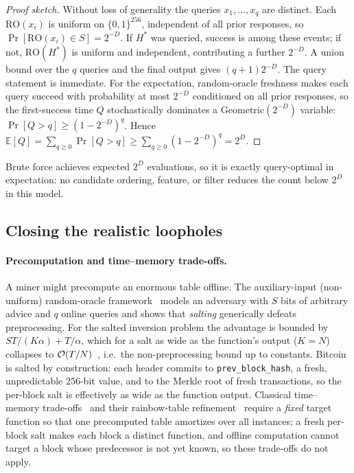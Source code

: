 \documentclass[11pt]{article}
\begin{document}
\begin{proof}[Proof sketch]
Without loss of generality the queries $x_1,\dots,x_q$ are distinct.
Each $\mathrm{RO}(x_i)$ is uniform on $\{0,1\}^{256}$, independent of all
prior responses, so $\Pr[\mathrm{RO}(x_i)\in S]=2^{-D}$. If $H^\ast$ was
queried, success is among these events; if not, $\mathrm{RO}(H^\ast)$ is
uniform and independent, contributing a further $2^{-D}$. A union bound
over the $q$ queries and the final output gives $(q+1)2^{-D}$. The query
statement is immediate. For the expectation, random-oracle freshness makes
each query succeed with probability at most $2^{-D}$ conditioned on all
prior responses, so the first-success time $Q$ stochastically dominates a
$\mathrm{Geometric}(2^{-D})$ variable: $\Pr[Q>q]\ge(1-2^{-D})^{q}$. Hence
$\mathbb{E}[Q]=\sum_{q\ge0}\Pr[Q>q]\ge\sum_{q\ge0}(1-2^{-D})^{q}=2^{D}$.
\end{proof}

Brute force achieves expected $2^{D}$ evaluations, so it is
exactly query-optimal in expectation: no candidate ordering, feature,
or filter reduces the count below $2^{D}$ in this model.

\subsection{Closing the realistic loopholes}

\paragraph{Precomputation and time--memory trade-offs.}
A miner might precompute an enormous table offline. The auxiliary-input
(non-uniform) random-oracle framework~\cite{unruh,cdgs,cdg} models an
adversary with $S$ bits of arbitrary advice and $q$ online queries and
shows that \emph{salting} generically defeats preprocessing. For the
salted inversion problem the advantage is bounded by
$ST/(K\alpha)+T/\alpha$, which for a salt as wide as the function's
output ($K=N$) collapses to $\mathcal{O}(T/N)$~\cite{dgk}, i.e.\ the
non-preprocessing bound up to constants. Bitcoin is salted by
construction: each header commits to \texttt{prev\_block\_hash}, a fresh,
unpredictable $256$-bit value, and to the Merkle root of fresh
transactions, so the per-block salt is effectively as wide as the
function output.
Classical time--memory trade-offs~\cite{hellman} and their rainbow-table
refinement~\cite{rainbow} require a \emph{fixed} target function so that
one precomputed table amortizes over all instances; a fresh per-block
salt makes each block a distinct function, and offline computation cannot
target a block whose predecessor is not yet known, so these trade-offs do
not apply.
\end{document}
